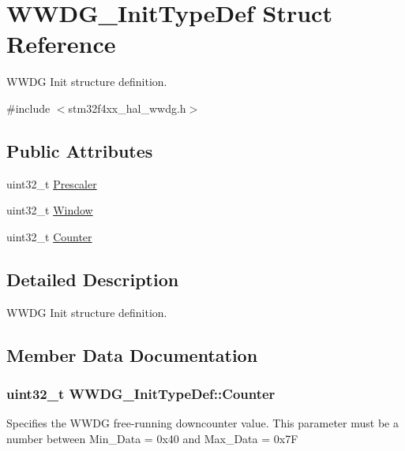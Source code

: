 \hypertarget{struct_w_w_d_g___init_type_def}{}\section{W\+W\+D\+G\+\_\+\+Init\+Type\+Def Struct Reference}
\label{struct_w_w_d_g___init_type_def}


W\+W\+DG Init structure definition.  




{\ttfamily \#include $<$stm32f4xx\+\_\+hal\+\_\+wwdg.\+h$>$}

\subsection*{Public Attributes}
\begin{DoxyCompactItemize}
\item 
uint32\+\_\+t \hyperlink{struct_w_w_d_g___init_type_def_a13973d685b89ebd47e985f912d54b225}{Prescaler}
\item 
uint32\+\_\+t \hyperlink{struct_w_w_d_g___init_type_def_aac1f83c04d7c2f284943add80347d44c}{Window}
\item 
uint32\+\_\+t \hyperlink{struct_w_w_d_g___init_type_def_a556cd5d451a2a51a8d65fc7cffae9184}{Counter}
\end{DoxyCompactItemize}


\subsection{Detailed Description}
W\+W\+DG Init structure definition. 

\subsection{Member Data Documentation}
\subsubsection[{\texorpdfstring{Counter}{Counter}}]{\setlength{\rightskip}{0pt plus 5cm}uint32\+\_\+t W\+W\+D\+G\+\_\+\+Init\+Type\+Def\+::\+Counter}\hypertarget{struct_w_w_d_g___init_type_def_a556cd5d451a2a51a8d65fc7cffae9184}{}\label{struct_w_w_d_g___init_type_def_a556cd5d451a2a51a8d65fc7cffae9184}
Specifies the W\+W\+DG free-\/running downcounter value. This parameter must be a number between Min\+\_\+\+Data = 0x40 and Max\+\_\+\+Data = 0x7F 
